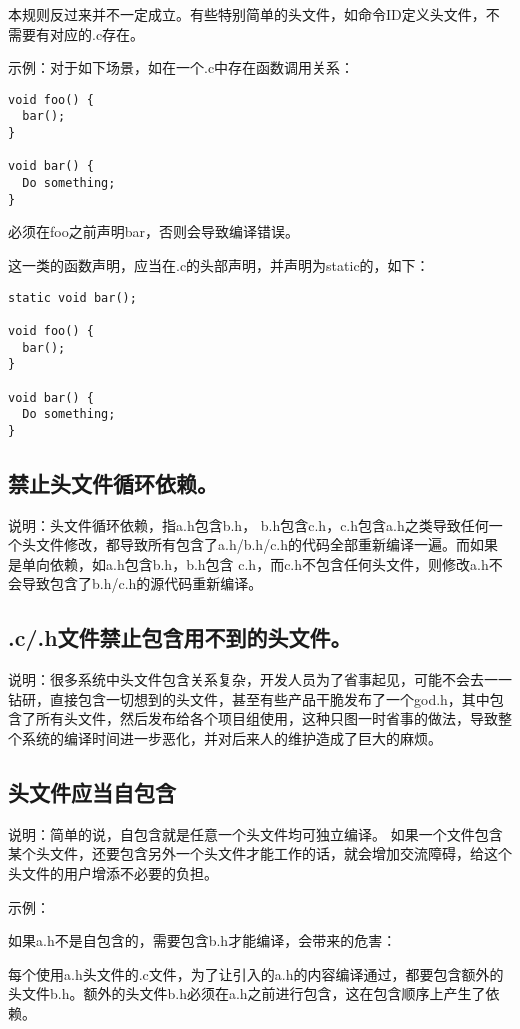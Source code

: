 本规则反过来并不一定成立。有些特别简单的头文件，如命令ID定义头文件，不需要有对应的.c存在。

示例：对于如下场景，如在一个.c中存在函数调用关系：
\begin{verbatim}
void foo() {
  bar();
}

void bar() {
  Do something;
}
\end{verbatim}

必须在foo之前声明bar，否则会导致编译错误。

这一类的函数声明，应当在.c的头部声明，并声明为static的，如下：
\begin{verbatim}
static void bar();

void foo() {
  bar();
}

void bar() {
  Do something;
}
\end{verbatim}


\subsection{禁止头文件循环依赖。}
说明：头文件循环依赖，指a.h包含b.h， b.h包含c.h，c.h包含a.h之类导致任何一个头文件修改，都导致所有包含了a.h/b.h/c.h的代码全部重新编译一遍。而如果是单向依赖，如a.h包含b.h，b.h包含
c.h，而c.h不包含任何头文件，则修改a.h不会导致包含了b.h/c.h的源代码重新编译。


\subsection{.c/.h文件禁止包含用不到的头文件。}
说明：很多系统中头文件包含关系复杂，开发人员为了省事起见，可能不会去一一钻研，直接包含一切想到的头文件，甚至有些产品干脆发布了一个god.h，其中包含了所有头文件，然后发布给各个项目组使用，这种只图一时省事的做法，导致整个系统的编译时间进一步恶化，并对后来人的维护造成了巨大的麻烦。


\subsection{头文件应当自包含}
说明：简单的说，自包含就是任意一个头文件均可独立编译。 如果一个文件包含某个头文件，还要包含另外一个头文件才能工作的话，就会增加交流障碍，给这个头文件的用户增添不必要的负担。

示例：

如果a.h不是自包含的，需要包含b.h才能编译，会带来的危害：

每个使用a.h头文件的.c文件，为了让引入的a.h的内容编译通过，都要包含额外的头文件b.h。额外的头文件b.h必须在a.h之前进行包含，这在包含顺序上产生了依赖。

